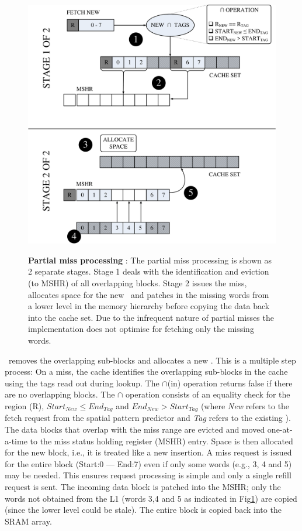 \begin{figure}[h]
  \includegraphics[width=\textwidth]{files/Figures/06-PartialMiss.pdf}
  \\
  \caption[Partial Miss]{\textbf{Partial miss processing} : The partial miss processing is shown as 2 separate stages. Stage 1 deals with the identification and eviction (to MSHR) of all overlapping blocks. Stage 2 issues the miss, allocates space for the new \AB\ and patches in the missing words from a lower level in the memory hierarchy before copying the data back into the cache set. Due to the infrequent nature of partial misses the implementation does not optimise for fetching only the missing words. }
  \label{fig:partial-miss}
\end{figure}

\clearpage

\AC\ removes the overlapping sub-blocks and allocates a new \AB{}. This is a multiple step process:  On a miss, the cache identifies the overlapping sub-blocks in the cache using the tags read out during lookup. The $\cap$(in) operation returns false if there are no overlapping blocks. The $\cap$ operation consists of an equality check for the region (R), $Start_{New} \leq End_{Tag}$ and $End_{New} > Start_{Tag}$ (where \textit{New} refers to the fetch request from the spatial pattern predictor and \textit{Tag} refers to the existing \AB{}).  The data blocks that overlap with the miss range are evicted and moved one-at-a-time to the miss status holding register (MSHR) entry.  Space is then allocated for the new block, i.e., it is treated like a new insertion. A miss request is issued for the entire block (Start:0 --- End:7) even if only some words (e.g., 3, 4 and 5) may be needed. This ensures request processing is simple and only a single refill request is sent.  The incoming data block is patched into the MSHR; only the words not obtained from the L1 (words 3,4 and 5 as indicated in Fig\ref{fig:partial-miss}) are copied (since the lower level could be stale).  The entire block is copied back into the SRAM array.

